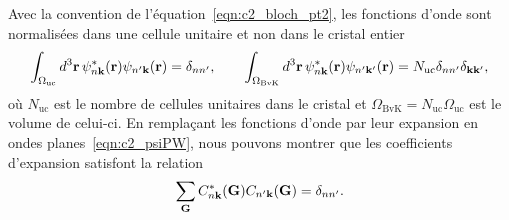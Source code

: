 Avec la convention de l'équation~\eqref{eqn:c2_bloch_pt2}, les fonctions d'onde sont normalisées dans une cellule unitaire et non dans le cristal entier
\begin{equation}
    \int_{\Omega_\text{uc}}d^3\mathbf{r}\,\psi_{n\mathbf{k}}^*(\mathbf{r})\psi_{n'\mathbf{k}}(\mathbf{r})=\delta_{nn'},\qquad\int_{\Omega_\text{BvK}}d^3\mathbf{r}\,\psi_{n\mathbf{k}}^*(\mathbf{r})\psi_{n'\mathbf{k}'}(\mathbf{r})=N_\text{uc}\delta_{nn'}\delta_{\mathbf{k}\mathbf{k}'},
    \label{eqn:c2_psi_norm}
\end{equation}
où $N_\text{uc}$ est le nombre de cellules unitaires dans le cristal et $\Omega_\text{BvK}=N_\text{uc}\Omega_\text{uc}$ est le volume de celui-ci. En remplaçant les fonctions d'onde par leur expansion en ondes planes~\eqref{eqn:c2_psiPW}, nous pouvons montrer que les coefficients d'expansion satisfont la relation
\begin{equation}
    \sum_{\mathbf{G}} C_{n\mathbf{k}}^*(\mathbf{G})C_{n'\mathbf{k}}(\mathbf{G})=\delta_{nn'}.
    \label{eqn:c2_C_norm}
\end{equation}

\bigskip
{}

